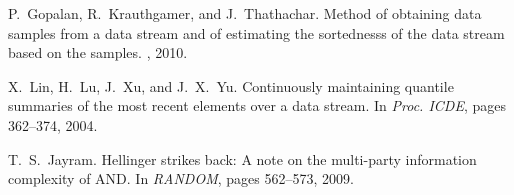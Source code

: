 \documentclass{llncs}
\begin{document}
{\begin{thebibliography}{10}
P.~Gopalan, R.~Krauthgamer, and J.~Thathachar.
\newblock Method of obtaining data samples from a data stream and of estimating
  the sortednesss of the data stream based on the samples.
, 2010.

X.~Lin, H.~Lu, J.~Xu, and J.~X.~Yu.
\newblock Continuously maintaining quantile summaries of the most recent 
  elements over a data stream.
\newblock In {\em Proc. ICDE}, pages 362--374, 2004.

T.~S.~Jayram.
\newblock Hellinger strikes back: A note on the multi-party information
complexity of AND.
\newblock In {\em RANDOM}, pages 562--573, 2009.
\end{thebibliography}
}
\end{document}
